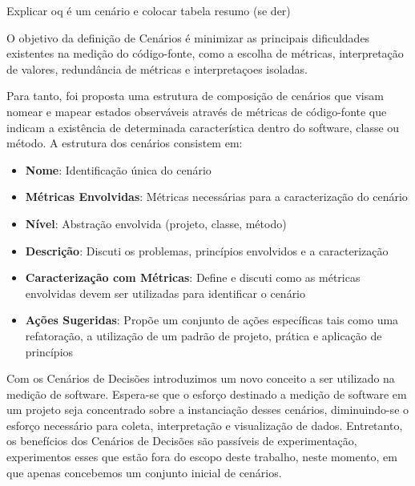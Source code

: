 

Explicar oq é um cenário e colocar tabela resumo (se der)


O objetivo da definição de Cenários é minimizar as principais dificuldades existentes na medição do código-fonte, como a escolha de métricas, interpretação de valores, redundância de métricas e interpretaçoes isoladas.

Para tanto, foi proposta uma estrutura de composição de cenários que visam nomear e mapear estados observáveis através de métricas de código-fonte que indicam a existência de determinada característica dentro do software, classe ou método. A estrutura dos cenários consistem em:
\begin{itemize}
\item \textbf{Nome}: Identificação única do cenário
\item \textbf{Métricas Envolvidas}: Métricas necessárias para a caracterização do cenário
\item \textbf{Nível}: Abstração envolvida (projeto, classe, método)
\item \textbf{Descrição}: Discuti os problemas, princípios envolvidos e a caracterização
\item \textbf{Caracterização com Métricas}: Define e discuti como as métricas envolvidas devem ser utilizadas para identificar o cenário
\item \textbf{Ações Sugeridas}: Propõe um conjunto de ações específicas tais como uma refatoração, a utilização de um padrão de projeto, prática e aplicação de princípios
\end{itemize}

Com os Cenários de Decisões introduzimos um novo conceito a ser utilizado na medição de software. Espera-se que o esforço destinado a medição de software em um projeto seja concentrado sobre a instanciação desses cenários, diminuindo-se o esforço necessário para coleta, interpretação e visualização de dados. Entretanto, os benefícios dos Cenários de Decisões são passíveis de experimentação, experimentos esses que estão fora do escopo deste trabalho, neste momento, 
em que apenas concebemos um conjunto inicial de cenários.

